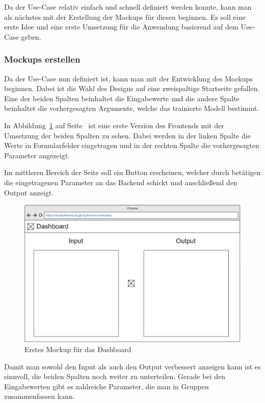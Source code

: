 Da der Use-Case relativ einfach und schnell definiert werden konnte, kann man als nächstes mit der Erstellung der
Mockups für diesen beginnen. Es soll eine erste Idee und eine erste Umsetzung für die Anwendung basierend auf dem
Uee-Case geben.

\subsubsection{Mockups erstellen}
Da der Use-Case nun definiert ist, kann man mit der Entwicklung des Mockups beginnen. Dabei ist die Wahl des
Designs auf eine zweispaltige Startseite gefallen. Eine der beiden Spalten beinhaltet die Eingabewerte und die andere
Spalte beinhaltet die vorhergesagten Argumente, welche das trainierte Modell bestimmt.

In Abbildung~\ref{fig:umsetzung_mockup_scale_1} auf Seite~\pageref{fig:umsetzung_mockup_scale_1} ist eine erste Version
des Frontends mit der Umsetzung der beiden Spalten zu sehen. Dabei werden in der linken Spalte die Werte in
Formularfelder eingetragen und in der rechten Spalte die vorhergesagten Parameter angezeigt.

Im mittleren Bereich der Seite soll ein Button erscheinen, welcher durch betätigen die eingetragenen Parameter an das
Backend schickt und anschließend den Output anzeigt.

\begin{figure}[h]
    \centering
    \includegraphics[width=\textwidth]{images/kapitel_4/mockup_scale_1.png}
    \caption{Erstes Mockup für das Dashboard}
    \label{fig:umsetzung_mockup_scale_1}
\end{figure}

Damit man sowohl den Input als auch den Output verbessert anzeigen kann ist es sinnvoll, die beiden Spalten noch weiter
zu unterteilen. Gerade bei den Eingabewerten gibt es zahlreiche Parameter, die man in Gruppen zusammenfassen kann.

